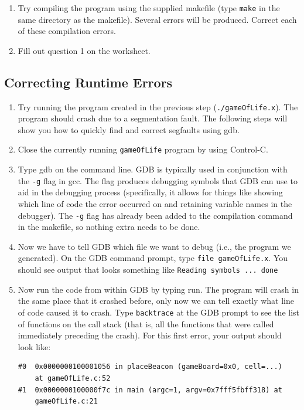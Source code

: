 \documentclass[12pt]{scrartcl}
\begin{document}
\begin{enumerate}
  \item Try compiling the program using the supplied makefile (type 
	\texttt{make} in the same directory as the makefile).  
	Several errors will be produced.  Correct each of these compilation 
	errors.
  \item Fill out question 1 on the worksheet.
\end{enumerate}

\subsection{Correcting Runtime Errors}

\begin{enumerate}
  \item Try running the program created in the previous step 
  	(\texttt{./gameOfLife.x}).  The program should crash due 
	to a segmentation fault.  The following steps will show you how 
	to quickly find and correct segfaults using gdb.  
  \item Close the currently running \texttt{gameOfLife} program 
	by using Control-C.
  \item Type gdb on the command line.  GDB is typically used in 
  	conjunction with the \texttt{-g} flag in gcc.  The flag 
	produces debugging symbols that GDB can use to aid in the 
	debugging process (specifically, it allows for things like showing 
	which line of code the error occurred on and retaining variable names 
	in the debugger).  The \texttt{-g} flag has already been added 
	to the compilation command in the makefile, so nothing extra needs to be done.
  \item Now we have to tell GDB which file we want to debug (i.e., the program 
	we generated).  On the GDB command prompt, type \texttt{file gameOfLife.x}.  
	You should see output that looks something like \texttt{Reading symbols ... done}
  \item Now run the code from within GDB by typing run.  The program will 
	crash in the same place that it crashed before, only now we can tell exactly 
	what line of code caused it to crash.  Type \texttt{backtrace} at the GDB prompt 
	to see the list of functions on the call stack (that is, all the functions that 
	were called immediately preceding the crash).  For this first error, your 
	output should look like:

\begin{verbatim}
#0  0x0000000100001056 in placeBeacon (gameBoard=0x0, cell=...) 
	at gameOfLife.c:52
#1  0x0000000100000f7c in main (argc=1, argv=0x7fff5fbff318) at 
	gameOfLife.c:21
\end{verbatim}


\end{enumerate}
\end{document}
